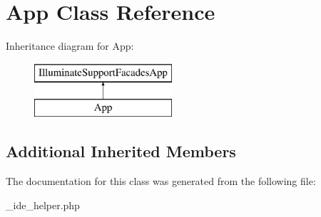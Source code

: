 \hypertarget{class_app}{}\section{App Class Reference}
\label{class_app}
Inheritance diagram for App\+:\begin{figure}[H]
\begin{center}
\leavevmode
\includegraphics[height=2.000000cm]{class_app}
\end{center}
\end{figure}
\subsection*{Additional Inherited Members}


The documentation for this class was generated from the following file\+:\begin{DoxyCompactItemize}
\item 
\+\_\+ide\+\_\+helper.\+php\end{DoxyCompactItemize}
